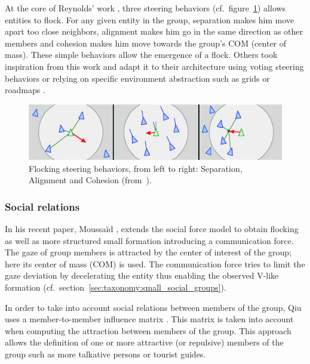 \documentclass[a4paper,titlepage]{article}
\begin{document}
At the core of Reynolds’ work \cite{Reynolds:1987vm,Reynolds:1999vr}, three steering behaviors (cf.\ figure~\ref{fig:flocking_steering_behaviors}) allows entities to flock. For any given entity in the group, separation makes him move apart too close neighbors, alignment makes him go in the same direction as other members and cohesion makes him move towards the group’s COM (center of mass). These simple behaviors allow the emergence of a flock. Others took inspiration from this work and adapt it to their architecture using voting steering behaviors \cite{Hostetler:2002wg} or relying on specific environment abstraction such as grids \cite{Loscos:2003wh} or roadmaps \cite{Bayazit:2003up,Kamphuis:2004ct}.

\begin{figure}[h]
\centering
\includegraphics[width=\textwidth]{FlockingSteeringBehaviors.jpg}
\caption{Flocking steering behaviors, from left to right: Separation, Alignment and Cohesion (from~\cite{Reynolds:1999vr}).}
\label{fig:flocking_steering_behaviors}
\end{figure}

\subsubsection{Social relations}

In his recent paper, Moussaïd \cite{Moussaid:2010ib}, extends the social force model \cite{Helbing:2000vh} to obtain flocking as well as more structured small formation introducing a communication force. The gaze of group members is attracted by the center of interest of the group; here its center of mass (COM) is used. The communication force tries to limit the gaze deviation by decelerating the entity thus enabling the observed V-like formation (cf.\ section~\ref{sec:taxonomy:small_social_groups}).

In order to take into account social relations between members of the group, Qiu uses a member-to-member influence matrix \cite{Qiu:2010ks}. This matrix is taken into account when computing the attraction between members of the group. This approach allows the definition of one or more attractive (or repulsive) members of the group such as more talkative persons or tourist guides.
\end{document}
